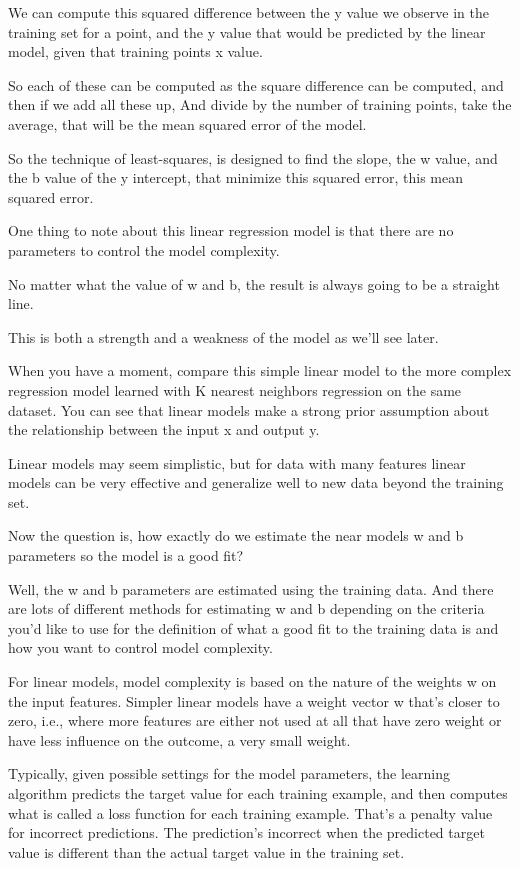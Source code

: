 \begin{multicols}{2}
We can compute this squared difference between the y value we observe in the training set for a point, and the y value that would be predicted by the linear model, given that training points x value. 

So each of these can be computed as the square difference can be computed, and then if we add all these up, And divide by the number of training points, take the average, that will be the mean squared error of the model. 

So the technique of least-squares, is designed to find the slope, the w value, and the b value of the y intercept, that minimize this squared error, this mean squared error. 

One thing to note about this linear regression model is that there are no parameters to control the model complexity. 

No matter what the value of w and b, the result is always going to be a straight line. 

This is both a strength and a weakness of the model as we'll see later. 

When you have a moment, compare this simple linear model to the more complex regression model learned with K nearest neighbors regression on the same dataset. You can see that linear models make a strong prior assumption about the relationship between the input x and output y. 

Linear models may seem simplistic, but for data with many features linear models can be very effective and generalize well to new data beyond the training set. 

Now the question is, how exactly do we estimate the near models w and b parameters so the model is a good fit? 

Well, the w and b parameters are estimated using the training data. And there are lots of different methods for estimating w and b depending on the criteria you'd like to use for the definition of what a good fit to the training data is and how you want to control model complexity. 

For linear models, model complexity is based on the nature of the weights w on the input features. Simpler linear models have a weight vector w that's closer to zero, i.e., where more features are either not used at all that have zero weight or have less influence on the outcome, a very small weight. 

Typically, given possible settings for the model parameters, the learning algorithm predicts the target value for each training example, and then computes what is called a loss function for each training example. That's a penalty value for incorrect predictions. The prediction's incorrect when the predicted target value is different than the actual target value in the training set. 


\end{multicols}
